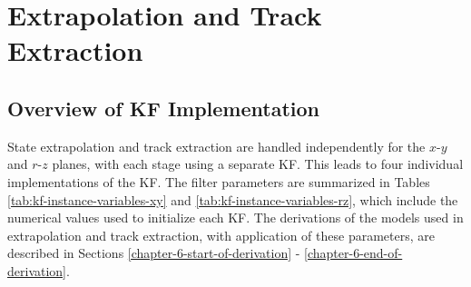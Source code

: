 \section{Extrapolation and Track Extraction}
\label{chapter-6-extrapolation-track-extraction}

\subsection{Overview of KF Implementation}
\label{chapter-6-overview-of-kf}

State extrapolation and track extraction are handled independently for the $x$-$y$ and $r$-$z$ planes, with each stage using a separate KF. This leads to four individual implementations of the KF. The filter parameters are summarized in Tables \ref{tab:kf-instance-variables-xy} and \ref{tab:kf-instance-variables-rz}, which include the numerical values used to initialize each KF. The derivations of the models used in extrapolation and track extraction, with application of these parameters, are described in Sections \ref{chapter-6-start-of-derivation} - \ref{chapter-6-end-of-derivation}.




